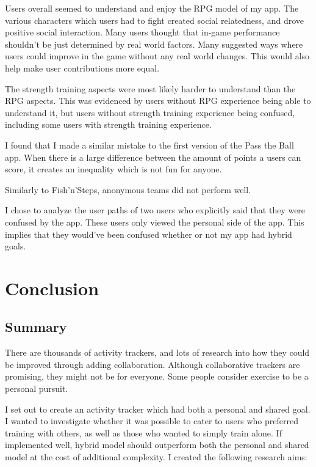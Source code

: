 \documentclass{l4proj}
\begin{document}
Users overall seemed to understand and enjoy the RPG model of my app. The various characters which users had to fight created social relatedness, and drove positive social interaction. Many users thought that in-game performance shouldn't be just determined by real world factors. Many suggested ways where users could improve in the game without any real world changes. This would also help make user contributions more equal. 

The strength training aspects were most likely harder to understand than the RPG aspects. This was evidenced by users without RPG experience being able to understand it, but users without strength training experience being confused, including some users with strength training experience.

I found that I made a similar mistake to the first version of the Pass the Ball app. When there is a large difference between the amount of points a users can score, it creates an inequality which is not fun for anyone.

Similarly to Fish'n'Steps, anonymous teams did not perform well.

I chose to analyze the user paths of two users who explicitly said that they were confused by the app. These users only viewed the personal side of the app. This implies that they would've been confused whether or not my app had hybrid goals.



\chapter{Conclusion}    
\section{Summary}
There are thousands of activity trackers, and lots of research into how they could be improved through adding collaboration. Although collaborative trackers are promising, they might not be for everyone. Some people consider exercise to be a personal pursuit.

I set out to create an activity tracker which had both a personal and shared goal. I wanted to investigate whether it was possible to cater to users who preferred training with others, as well as those who wanted to simply train alone. If implemented well, hybrid model should outperform both the personal and shared model at the cost of additional complexity. I created the following research aims:
\end{document}

